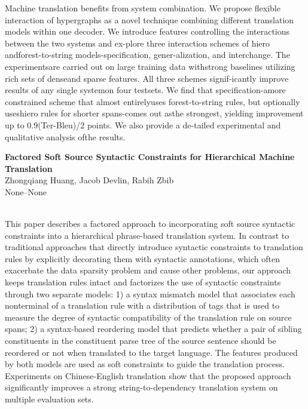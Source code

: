 \documentclass[twoside,makeidx]{book}
\begin{document}
\nopagebreak%
\noindent%
{\small Machine translation benefits from system combination. We propose flexible interaction of hypergraphs as a novel technique combining different translation models within one decoder. We introduce features controlling the interactions between the two systems and ex-plore three interaction schemes of hiero andforest-to-string models-specification, gener-alization, and interchange. The experimentsare carried out on large training data withstrong baselines utilizing rich sets of denseand sparse features. All three schemes signif-icantly improve results of any single systemon four testsets. We find that specification-amore constrained scheme that almost entirelyuses forest-to-string rules, but optionally useshiero rules for shorter spans-comes out asthe strongest, yielding improvement up to 0.9(Ter-Bleu)/2 points. We also provide a de-tailed experimental and qualitative analysis ofthe results.}
\par\vspace{2em}\noindent%
\begin{minipage}{\linewidth}%
\begin{center}
\textbf{\normalsize Factored Soft Source Syntactic Constraints for Hierarchical Machine Translation}\\
\normalsize  Zhongqiang Huang,  Jacob Devlin,  Rabih Zbib\\
{\small None--None}\\
\end{center}
\end{minipage}\\[0.5em]
\nopagebreak%
\noindent%
{\small This paper describes a factored approach to incorporating soft source syntactic constraints into a hierarchical phrase-based translation system. In contrast to traditional approaches that directly introduce syntactic constraints to translation rules by explicitly decorating them with syntactic annotations, which often exacerbate the data sparsity problem and cause other problems, our approach keeps translation rules intact and factorizes the use of syntactic constraints through two separate models: 1) a syntax mismatch model that associates each nonterminal of a translation rule with a distribution of tags that is used to measure the degree of syntactic compatibility of the translation rule on source spans;  2) a syntax-based reordering model that predicts whether a pair of sibling constituents in the constituent parse tree of the source sentence should be reordered or not when translated to the target language. The features produced by both models are used as soft constraints to guide the translation process. Experiments on Chinese-English translation show that the proposed approach significantly improves a strong string-to-dependency translation system on multiple evaluation sets.}
\end{document}
